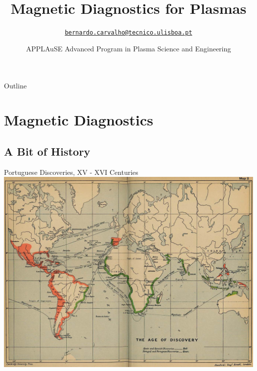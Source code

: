 \documentclass{beamer}
\title[Magnetic Diagnostics for Plasmas, APPLAuSE]{Magnetic Diagnostics for Plasmas}
\author[B.~Carvalho, 25 September 2019] %
{\href{mailto:bernardo.carvalho@tecnico.ulisboa.pt}{\nolinkurl{bernardo.carvalho@tecnico.ulisboa.pt}} }
\date[APPLAuSE 2018] %
{\small APPLAuSE Advanced Program in Plasma Science and Engineering
}
\begin{document}


\begin{frame}
\titlepage
\end{frame}

\begin{frame}{Outline}
  \tableofcontents
\end{frame}




\section{Magnetic Diagnostics}
\subsection*{A Bit of History}
\begin{frame}{Portuguese Discoveries, XV - XVI Centuries}
\includegraphics[width=8.5 cm]{discov}
\end{frame}
\end{document}
